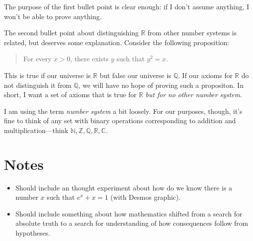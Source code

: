 \documentclass[
  letterpaper,
  DIV=11,
  numbers=noendperiod]{scrreprt}
\providecommand{\tightlist}{%
  \setlength{\itemsep}{0pt}\setlength{\parskip}{0pt}}
\def\R{\mathbb R}
\def\Q{\mathbb Q}
\theoremstyle{plain}
\theoremstyle{definition}
\theoremstyle{plain}
\theoremstyle{plain}
\theoremstyle{definition}
\theoremstyle{definition}
\theoremstyle{remark}
\begin{document}
The purpose of the first bullet point is clear enough: if I don't assume
anything, I won't be able to prove anything.

The second bullet point about distinguishing \(\R\) from other number
systems is related, but deserves some explanation. Consider the
following proposition:

\begin{quote}
For every \(x>0\), there exists \(y\) such that \(y^2=x\).
\end{quote}

This is true if our universe is \(\R\) but false our universe is \(\Q\).
If our axioms for \(\R\) do not distinguish it from \(\Q\), we will have
no hope of proving such a propositon. In short, I want a set of axioms
that is true for \(\R\) \emph{but for no other number system}.

\begin{tcolorbox}[enhanced jigsaw, titlerule=0mm, opacitybacktitle=0.6, leftrule=.75mm, bottomrule=.15mm, left=2mm, arc=.35mm, colback=white, rightrule=.15mm, colframe=quarto-callout-note-color-frame, toptitle=1mm, breakable, opacityback=0, colbacktitle=quarto-callout-note-color!10!white, bottomtitle=1mm, title=\textcolor{quarto-callout-note-color}{\faInfo}\hspace{0.5em}{Note}, coltitle=black, toprule=.15mm]

I am using the term \emph{number system} a bit loosely. For our
purposes, though, it's fine to think of any set with binary operations
corresponding to addition and multiplication---think
\(\mathbb{N},\mathbb{Z},\mathbb{Q},\mathbb{R},\mathbb{C}\).

\end{tcolorbox}

\section*{Notes}\label{notes}


\begin{itemize}
\tightlist
\item
  Should include an thought experiment about how do we know there is a
  number \(x\) such that \(e^x+x=1\) (with Desmos graphic).
\item
  Should include something about how mathematics shifted from a search
  for absolute truth to a search for understanding of how consequences
  follow from hypotheses.
\end{itemize}
\end{document}
